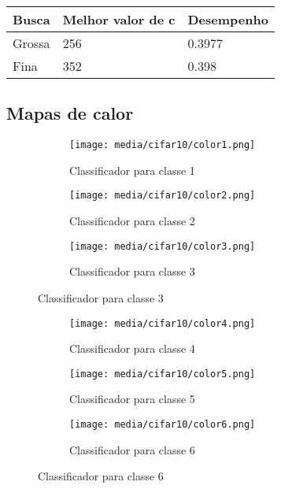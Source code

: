 \documentclass[a4paper]{article}
\begin{document}
\begin{table}[H]
    \centering
    \begin{tabular}{|l|l|l|}
        \hline
        \textbf{Busca} & \textbf{Melhor valor de c} & \textbf{Desempenho} \\ \hline
        Grossa         & 256                        & 0.3977              \\ \hline
        Fina           & 352                        & 0.398               \\ \hline
    \end{tabular}
\end{table}


\subsection{Mapas de calor}

\begin{figure}[H]
    \centering
    \begin{subfigure}{.33\textwidth}
        \centerline{\texttt{[image: media/cifar10/color1.png]}}
        \caption{Classificador para classe 1}
        \label{fig:fig3}
    \end{subfigure}%
    \begin{subfigure}{.33\textwidth}
        \centerline{\texttt{[image: media/cifar10/color2.png]}}
        \caption{Classificador para classe 2}
        \label{fig:fig4}
    \end{subfigure}%
    \begin{subfigure}{.33\textwidth}
        \centerline{\texttt{[image: media/cifar10/color3.png]}}
        \caption{Classificador para classe 3}
        \label{fig:fig5}
    \end{subfigure}
\end{figure}

\begin{figure}[H]
    \centering
    \begin{subfigure}{.33\textwidth}
        \centerline{\texttt{[image: media/cifar10/color4.png]}}
        \caption{Classificador para classe 4}
        \label{fig:fig6}
    \end{subfigure}%
    \begin{subfigure}{.33\textwidth}
        \centerline{\texttt{[image: media/cifar10/color5.png]}}
        \caption{Classificador para classe 5}
        \label{fig:fig7}
    \end{subfigure}%
    \begin{subfigure}{.33\textwidth}
        \centerline{\texttt{[image: media/cifar10/color6.png]}}
        \caption{Classificador para classe 6}
        \label{fig:fig8}
    \end{subfigure}
\end{figure}
\end{document}

